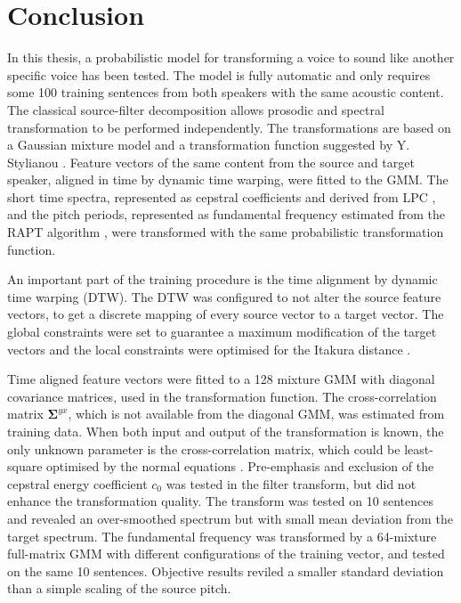 \chapter{Conclusion} %
\label{cha:conclusion}

In this thesis, a probabilistic model for transforming a voice to sound like another specific voice has been tested. The model is fully automatic and only requires some 100 training sentences from both speakers with the same acoustic content. The classical source-filter decomposition allows prosodic and spectral transformation to be performed independently. The transformations are based on a Gaussian mixture model and a transformation function suggested by Y. Stylianou \cite{stylianou98}. Feature vectors of the same content from the source and target speaker, aligned in time by dynamic time warping, were fitted to the GMM. The short time spectra, represented as cepstral coefficients and derived from LPC \cite{atal68}, and the pitch periods, represented as fundamental frequency estimated from the RAPT algorithm \cite{talkin95}, were transformed with the same probabilistic transformation function.

An important part of the training procedure is the time alignment by dynamic time warping (DTW). The DTW was configured to not alter the source feature vectors, to get a discrete mapping of every source vector to a target vector. The global constraints were set to guarantee a maximum modification of the target vectors and the local constraints were optimised for the Itakura distance \cite{itakura75min}.

Time aligned feature vectors were fitted to a 128 mixture GMM with diagonal covariance matrices, used in the transformation function. The cross-correlation matrix $\mathbf{\Sigma}^{yx}$, which is not available from the diagonal GMM, was estimated from training data. When both input and output of the transformation is known, the only unknown parameter is the cross-correlation matrix, which could be least-square optimised by the normal equations \cite{strang06}. Pre-emphasis \cite{turk06} and exclusion of the cepstral energy coefficient $c_0$ \cite{stylianou98} was tested in the filter transform, but did not enhance the transformation quality. The transform was tested on 10 sentences and revealed an over-smoothed spectrum but with small mean deviation from the target spectrum. The fundamental frequency was transformed by a 64-mixture full-matrix GMM with different configurations of the training vector, and tested on the same 10 sentences. Objective results reviled a smaller standard deviation than a simple scaling of the source pitch. 

